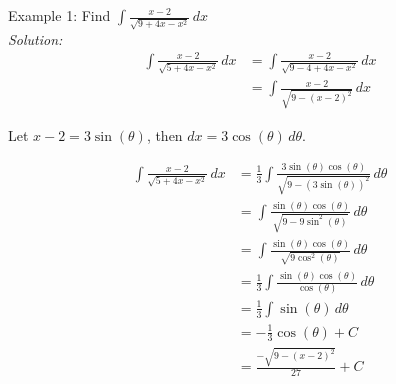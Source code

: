 \documentclass[16pt]{article}
\theoremstyle{remark}
\begin{document}
\begin{mdframed}[style=TheoremFrame]
Example 1: Find $\displaystyle{\int \frac{x-2}{\sqrt{9+4x-x^2}}\, dx  }$\\

\textit{Solution:}
\begin{align*}
\int \frac{x-2}{\sqrt{5+4x-x^2}}\, dx  &= \int \frac{x-2}{\sqrt{9-4+4x-x^2}}\, dx\\[1.5ex]
&= \int \frac{x-2}{\sqrt{9-(x-2)^2}}\, dx
\end{align*}
\begin{center}
Let $\displaystyle{x-2 = 3\sin(\theta)}$, then $dx = 3 \cos(\theta)\, d\theta$.
\end{center}
\begin{align*}
\int \frac{x-2}{\sqrt{5+4x-x^2}}\, dx  &= \frac{1}{3} \int \frac{3\sin(\theta)\cos(\theta)}{\sqrt{9 - (3\sin(\theta))^2}}\, d\theta\\[1.5ex]
&= \int \frac{\sin(\theta)\cos(\theta)}{\sqrt{9 - 9\sin^2(\theta)}}\, d\theta\\[1.5ex]
&= \int \frac{\sin(\theta)\cos(\theta)}{\sqrt{9\cos^2(\theta)}}\, d\theta\\[1.5ex]
&= \frac{1}{3}\int \frac{\sin(\theta)\cos(\theta)}{\cos(\theta)}\, d\theta\\[1.5ex]
&= \frac{1}{3} \int \sin(\theta) \, d\theta\\[1.5ex]
&= -\frac{1}{3} \cos(\theta) + C\\[1.5ex]
&= \frac{-\sqrt{9-(x-2)^2}}{27} + C
\end{align*}
\end{mdframed}
\newpage
\end{document}
